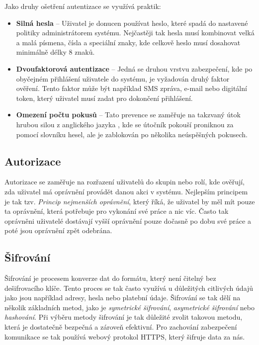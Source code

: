 \noindent
Jako druhy ošetření autentizace se využívá praktik:
\begin{itemize}
    \item \textbf{Silná hesla} -- Uživatel je donucen používat heslo, které spadá do nastavené politiky administrátorem systému. Nejčastěji tak hesla musí kombinovat velká a malá písmena, čísla a speciální znaky, kde celkově heslo musí dosahovat minimálně délky 8 znaků.
    \item \textbf{Dvoufaktorová autentizace} -- Jedná se druhou vrstvu zabezpečení, kde po obyčejném přihlášení uživatele do systému, je vyžadován druhý faktor ověření. Tento faktor může být například SMS zpráva, e-mail nebo digitální token, který uživatel musí zadat pro dokončení přihlášení.
    \item \textbf{Omezení počtu pokusů} -- Tato prevence se zaměřuje na takzvaný útok hrubou silou z anglického jazyka \textit{}, kde se útočník pokouší proniknou za pomocí slovníku hesel, ale je zablokován po několika neúspěšných pokusech.
\end{itemize}

\subsection{Autorizace}
\label{subsec:security-authorization}
Autorizace se zaměřuje na rozřazení uživatelů do skupin nebo rolí, kde ověřují, zda uživatel má oprávnění provádět danou akci v systému. Nejlepším principem je tak tzv. \textit{Princip nejmenších oprávnění}, který říká, že uživatel by měl mít pouze ta oprávnění, která potřebuje pro vykonání své práce a nic víc. Často tak oprávněni uživatelé dostávají vyšší oprávnění pouze dočasně po dobu své práce a poté jsou oprávnění zpět odebrána.

\subsection{Šifrování}
\label{subsec:security-encryption}
Šifrování je procesem konverze dat do formátu, který není čitelný bez dešifrovacího klíče. Tento proces se tak často využívá u důležitých citlivých údajů jako jsou například adresy, hesla nebo platební údaje. Šifrování se tak dělí na několik základních metod, jako je \textit{symetrické šifrování}, \textit{asymetrické šifrování} nebo \textit{hashování}. Při výběru metody šifrování je tak důležité zvolit takovou metodu, která je dostatečně bezpečná a zároveň efektivní. Pro zachování zabezpečení komunikace se tak používá webový protokol HTTPS, který šifruje data za nás.


